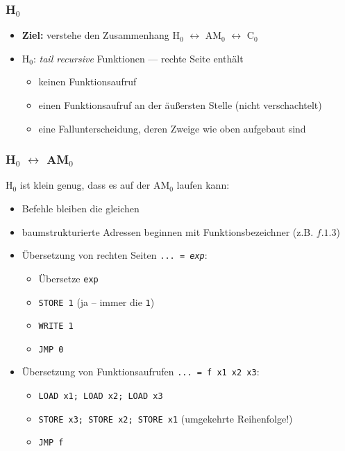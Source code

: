 \documentclass{beamer}
\begin{document}
\begin{frame} \frametitle{H${}_\text{0}$}
	\begin{itemize}
		\item \textbf{Ziel:} verstehe den Zusammenhang H${}_\text{0}$ $\leftrightarrow$ AM${}_\text{0}$ $\leftrightarrow$ C${}_\text{0}$
		\item H${}_\text{0}$: \textit{tail recursive} Funktionen --- rechte Seite enthält
		\begin{itemize}
			\item keinen Funktionsaufruf
			\item einen Funktionsaufruf an der äußersten Stelle (nicht verschachtelt)
			\item eine Fallunterscheidung, deren Zweige wie oben aufgebaut sind
		\end{itemize}
	\end{itemize}
\end{frame}

\begin{frame} \frametitle{H${}_\text{0}$ $\leftrightarrow$ AM${}_\text{0}$}
	H${}_\text{0}$ ist klein genug, dass es auf der AM${}_\text{0}$ laufen kann:
	\begin{itemize}
		\item Befehle bleiben die gleichen
		\item baumstrukturierte Adressen beginnen mit Funktionsbezeichner (z.B. $f.1.3$)
		
		\medskip
		\item Übersetzung von rechten Seiten \texttt{... = \textit{exp}}: 
		\begin{itemize}
			\item Übersetze \texttt{exp}
			\item \texttt{STORE 1} \hspace{2em} (ja -- immer die \texttt{1})
			\item \texttt{WRITE 1}
			\item \texttt{JMP 0}
		\end{itemize}

		\medskip
		\item Übersetzung von Funktionsaufrufen \texttt{... = f x1 x2 x3}:
		\begin{itemize}
			\item \texttt{LOAD x1; LOAD x2; LOAD x3}
			\item \texttt{STORE x3; STORE x2; STORE x1} {\footnotesize(umgekehrte Reihenfolge!)}
			\item \texttt{JMP f}
		\end{itemize}
		
	\end{itemize}
\end{frame}
\end{document}
